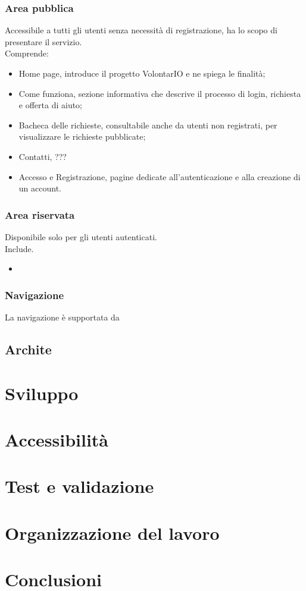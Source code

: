 \documentclass[a4paper,11pt]{article}
\begin{document}
\subsubsection{Area pubblica}
Accessibile a tutti gli utenti senza necessità di registrazione, ha lo scopo di presentare il servizio.\\
Comprende:
\begin{itemize}
    \item Home page, introduce il progetto VolontarIO e ne spiega le finalità;
    \item Come funziona, sezione informativa che descrive il processo di login, richiesta e offerta di aiuto;
    \item Bacheca delle richieste, consultabile anche da utenti non registrati, per visualizzare le richieste pubblicate;
    \item Contatti, ???
    \item Accesso e Registrazione, pagine dedicate all’autenticazione e alla creazione di un account.
\end{itemize}
\subsubsection{Area riservata}
Disponibile solo per gli utenti autenticati.\\
Include.
\begin{itemize}
    \item 
\end{itemize}
\subsubsection{Navigazione}
La navigazione è supportata da 
\subsection{Archite}
\section{Sviluppo}
\section{Accessibilità}
\section{Test e validazione}
\section{Organizzazione del lavoro}
\section{Conclusioni}
\end{document}
